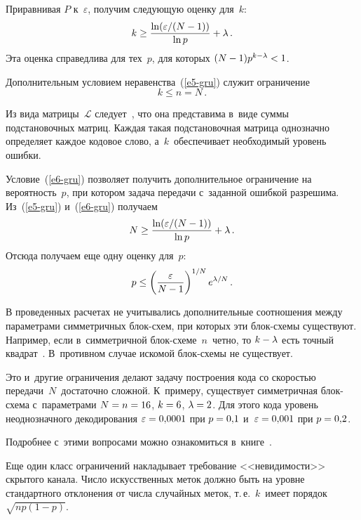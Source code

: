 \begin{multicols}{2}
  Приравнивая $P$ к~$\varepsilon$, получим следующую оценку для~$k$:
  \begin{equation}
  k\geq \displaystyle\frac{\displaystyle \ln(\varepsilon/(N-1))\mathstrut}{\displaystyle \ln p\mathstrut} +\lambda\,.
  \label{e5-gru}
  \end{equation}
  Эта оценка справедлива для тех~$p$, для которых  $(N-1)p^{k-\lambda} 
\hm<1$.
  
  Дополнительным условием неравенства~(\ref{e5-gru}) служит ограничение 
  \begin{equation}
  k\leq n=N\,.
  \label{e6-gru}
  \end{equation}
  
  Из вида матрицы~$\mathcal{L}$ следует~\cite{8-gru}, что она представима 
в~виде суммы подстановочных матриц. Каж\-дая такая подстановочная матрица 
однозначно определяет каждое кодовое слово, а~$k$~обеспечивает 
необходимый уровень ошибки.
  
  Условие~(\ref{e6-gru}) позволяет получить дополнительное ограничение на 
вероятность~$p$, при котором задача передачи с~заданной ошибкой разрешима. 
Из~(\ref{e5-gru}) и~(\ref{e6-gru}) получаем
  \begin{equation*}
  N\geq \displaystyle\frac{\displaystyle \ln(\varepsilon/(N-1))\mathstrut}{\displaystyle \ln p\mathstrut} +\lambda\,.
  \end{equation*}
    Отсюда получаем еще одну оценку для~$p$:
  $$
  p\leq \left( \displaystyle\frac{\displaystyle \varepsilon\mathstrut}{\displaystyle N-1\mathstrut}\right)^{1/N} e^{\lambda/N}\,.
  $$
  
  В проведенных расчетах не учитывались дополнительные соотношения 
между параметрами симметричных блок-схем, при которых эти блок-схе\-мы 
существуют. Например, если в~симметричной блок-схе\-ме~$n$~чет\-но, то 
$k\hm-\lambda$ есть точный квадрат~\cite{7-gru}. В~противном случае искомой 
блок-схе\-мы не существует. 
  
  Это и~другие ограничения делают задачу построения кода со скоростью 
передачи~$N$~достаточно сложной. К~примеру, существует симметричная 
блок-схе\-ма с~параметрами $N\hm=n\hm=16$, $k \hm= 6$, $\lambda\hm = 2$. 
Для этого кода уровень неоднозначного декодирования $\varepsilon\hm = 
0{,}0001$ при $p\hm = 0{,}1$ и~$\varepsilon\hm = 0{,}001$ при $p\hm = 0{,}2$.
  
  Подробнее с~этими вопросами можно ознакомиться в~книге~\cite{7-gru}. 
  
  Еще один класс ограничений накладывает требование <<невидимости>> 
скрытого канала. Число искусственных меток должно быть на уровне 
стандартного отклонения от числа случайных меток, т.\,е.~$k$~имеет порядок 
$\sqrt{np(1-p)}$.
  

\end{multicols}
